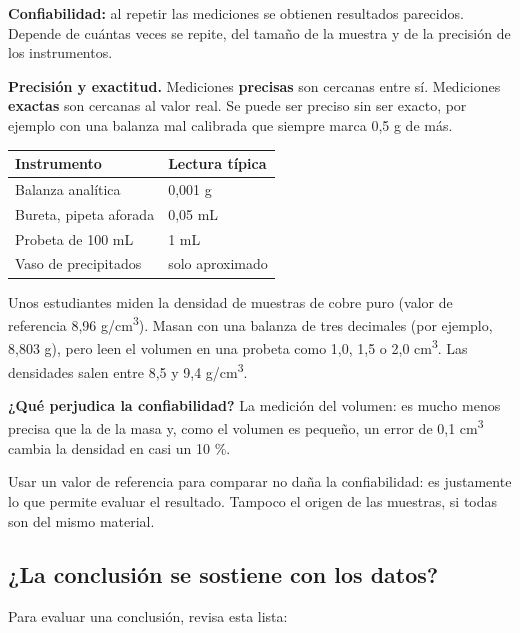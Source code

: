  

\textbf{Confiabilidad:} al repetir las mediciones se obtienen resultados parecidos. Depende de cuántas veces se repite, del tamaño de la muestra y de la precisión de los instrumentos.

 

\textbf{Precisión y exactitud.} Mediciones \textbf{precisas} son cercanas entre sí. Mediciones \textbf{exactas} son cercanas al valor real. Se puede ser preciso sin ser exacto, por ejemplo con una balanza mal calibrada que siempre marca 0,5 g de más.

 
\begin{center}\small
\begin{tabular}{@{}ll@{}}
\toprule
\textbf{Instrumento} & \textbf{Lectura típica} \\
\midrule
Balanza analítica & 0,001 g \\
Bureta, pipeta aforada & 0,05 mL \\
Probeta de 100 mL & 1 mL \\
Vaso de precipitados & solo aproximado \\
\bottomrule
\end{tabular}
\end{center}
  
\begin{ejemplo} Unos estudiantes miden la densidad de muestras de cobre puro (valor de referencia 8,96 g/cm\textsuperscript{3}). Masan con una balanza de tres decimales (por ejemplo, 8,803 g), pero leen el volumen en una probeta como 1,0, 1,5 o 2,0 cm\textsuperscript{3}. Las densidades salen entre 8,5 y 9,4 g/cm\textsuperscript{3}.\par \textbf{¿Qué perjudica la confiabilidad?} La medición del volumen: es mucho menos precisa que la de la masa y, como el volumen es pequeño, un error de 0,1 cm\textsuperscript{3} cambia la densidad en casi un 10 \%.\end{ejemplo}
 
\begin{ojo} Usar un valor de referencia para comparar no daña la confiabilidad: es justamente lo que permite evaluar el resultado. Tampoco el origen de las muestras, si todas son del mismo material.\end{ojo}
\subsection{¿La conclusión se sostiene con los datos?}
Para evaluar una conclusión, revisa esta lista:

